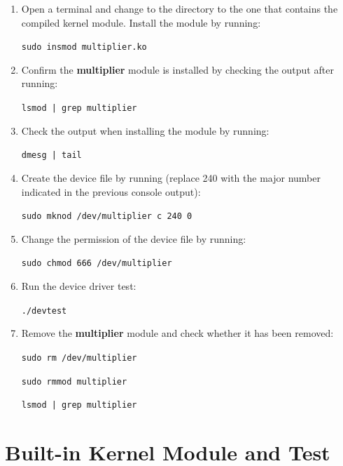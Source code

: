 \documentclass[11pt,letterpaper,titlepage]{article}
\begin{document}
\begin{enumerate}
    
    \item Open a terminal and change to the directory to the one that contains the compiled kernel module. Install the module by running:
    
    \texttt{sudo insmod multiplier.ko}
    
    \item Confirm the \textbf{multiplier} module is installed by checking the output after running:
    
    \texttt{lsmod | grep multiplier}
    
    \item Check the output when installing the module by running:
    
    \texttt{dmesg | tail}
    
    \item Create the device file by running (replace 240 with the major number indicated in the previous console output): 
    
    \texttt{sudo mknod /dev/multiplier c 240 0}
    
    \item Change the permission of the device file by running:
    
    \texttt{sudo chmod 666 /dev/multiplier}
    
    \item Run the device driver test:
    
    \texttt{./devtest}
    
    \item Remove the \textbf{multiplier} module and check whether it has been removed:
    
    \texttt{sudo rm /dev/multiplier} 
    
    \texttt{sudo rmmod multiplier}
    
    \texttt{lsmod | grep multiplier}
    
\end{enumerate}

\section{Built-in Kernel Module and Test}
\end{document}
